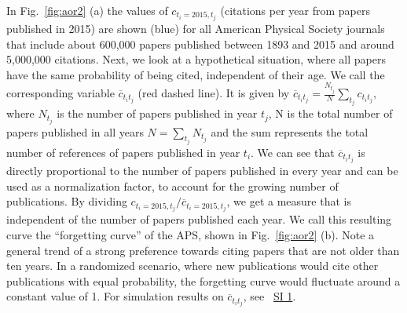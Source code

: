 \documentclass[fleqn,10pt]{wlscirep}
\begin{document}
In Fig.~\ref{fig:aor2} (a) the values of $c_{t_i=2015,t_j}$ (citations per year from papers published in 2015) are shown (blue) for all American Physical Society journals that include about 600,000 papers published between 1893 and 2015 and around 5,000,000 citations. Next, we look at a hypothetical situation, where all papers have the same probability of being cited, independent of their age.
We call the corresponding variable $\overline{c}_{t_it_j}$ (red dashed line).
It is given by $\overline{c}_{t_it_j} = \frac{N_{t_j}}{N}\sum_{t_j} {c}_{t_it_j} $, where $N_{t_j}$ is the number of papers published in year $t_j$, N is the total number of papers published in all years $N=\sum_{t_j}N_{t_j} $ and the sum represents the total number of references of papers published in year $t_i$.
We can see that $\overline{c}_{t_it_j}$ is directly proportional to the number of papers published in every year and can be used as a normalization factor, to account for the growing number of publications. By dividing $c_{t_i=2015,t_j} / \overline{c}_{t_i=2015,t_j}$, we get a measure that is independent of the number of papers published each year.  We call this resulting curve the ``forgetting curve'' of the APS, shown in Fig.~\ref{fig:aor2} (b). Note a general trend of a strong preference towards citing papers that are not older than ten years. In a randomized scenario, where new publications would cite other publications with equal probability, the forgetting curve would fluctuate around a constant value of 1. For simulation results on $\overline{c}_{t_it_j}$, see ~\hyperref[SI1]{SI 1}.
\end{document}
